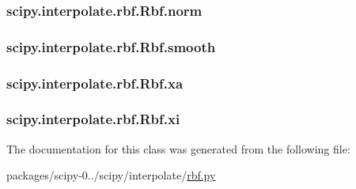 \subsubsection[{norm}]{\setlength{\rightskip}{0pt plus 5cm}scipy.\+interpolate.\+rbf.\+Rbf.\+norm}\label{classscipy_1_1interpolate_1_1rbf_1_1Rbf_a60d3b97eec4bbf56b1fd17667e6f102c}
\hypertarget{classscipy_1_1interpolate_1_1rbf_1_1Rbf_a162528574686f807f8836f40d8592387}{}
\subsubsection[{smooth}]{\setlength{\rightskip}{0pt plus 5cm}scipy.\+interpolate.\+rbf.\+Rbf.\+smooth}\label{classscipy_1_1interpolate_1_1rbf_1_1Rbf_a162528574686f807f8836f40d8592387}
\hypertarget{classscipy_1_1interpolate_1_1rbf_1_1Rbf_ab76f2f6bfa972d44175d1c51507d2e16}{}
\subsubsection[{xa}]{\setlength{\rightskip}{0pt plus 5cm}scipy.\+interpolate.\+rbf.\+Rbf.\+xa}\label{classscipy_1_1interpolate_1_1rbf_1_1Rbf_ab76f2f6bfa972d44175d1c51507d2e16}
\hypertarget{classscipy_1_1interpolate_1_1rbf_1_1Rbf_af5d200c0303d7a606e9c68ae19bb308d}{}
\subsubsection[{xi}]{\setlength{\rightskip}{0pt plus 5cm}scipy.\+interpolate.\+rbf.\+Rbf.\+xi}\label{classscipy_1_1interpolate_1_1rbf_1_1Rbf_af5d200c0303d7a606e9c68ae19bb308d}


The documentation for this class was generated from the following file\+:\begin{DoxyCompactItemize}
\item 
packages/scipy-\/0../scipy/interpolate/\hyperlink{rbf_8py}{rbf.\+py}\end{DoxyCompactItemize}
